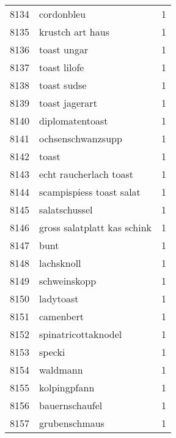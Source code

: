 \begin{tabular}{llr}
8134 &                                         cordonbleu &      1 \\
8135 &                                   krustch art haus &      1 \\
8136 &                                        toast ungar &      1 \\
8137 &                                       toast lilofe &      1 \\
8138 &                                        toast sudse &      1 \\
8139 &                                     toast jagerart &      1 \\
8140 &                                    diplomatentoast &      1 \\
8141 &                                  ochsenschwanzsupp &      1 \\
8142 &                                              toast &      1 \\
8143 &                             echt raucherlach toast &      1 \\
8144 &                           scampispiess toast salat &      1 \\
8145 &                                      salatschussel &      1 \\
8146 &                        gross salatplatt kas schink &      1 \\
8147 &                                               bunt &      1 \\
8148 &                                         lachsknoll &      1 \\
8149 &                                       schweinskopp &      1 \\
8150 &                                          ladytoast &      1 \\
8151 &                                          camenbert &      1 \\
8152 &                                spinatricottaknodel &      1 \\
8153 &                                             specki &      1 \\
8154 &                                           waldmann &      1 \\
8155 &                                       kolpingpfann &      1 \\
8156 &                                     bauernschaufel &      1 \\
8157 &                                      grubenschmaus &      1 \\

\end{tabular}

